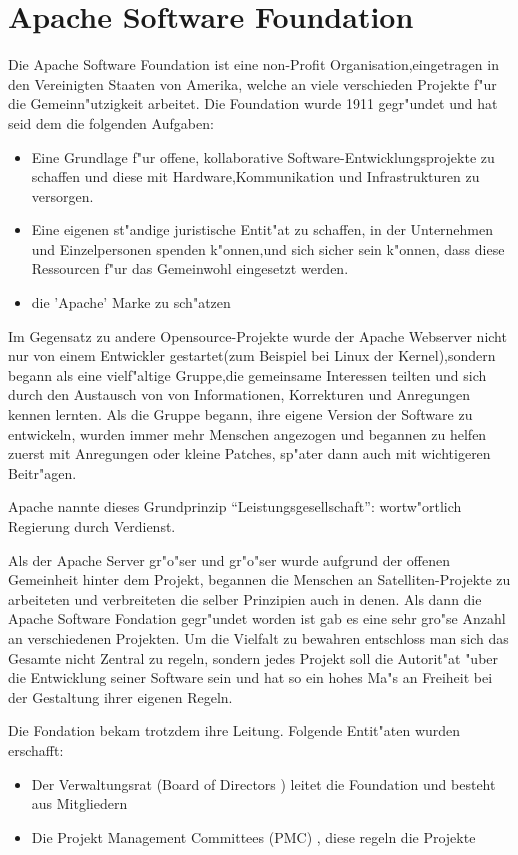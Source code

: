 \section{Apache Software Foundation}
Die Apache Software Foundation ist eine non-Profit Organisation,eingetragen in den Vereinigten Staaten von Amerika, welche an viele verschieden Projekte f"ur die Gemeinn"utzigkeit arbeitet. Die Foundation wurde 1911 gegr"undet und hat seid dem die folgenden Aufgaben:
\begin{itemize}
\item{Eine Grundlage f"ur offene, kollaborative Software-Entwicklungsprojekte zu schaffen und diese mit Hardware,Kommunikation und Infrastrukturen zu versorgen. }
\item{Eine eigenen st"andige juristische Entit"at zu schaffen, in der Unternehmen und Einzelpersonen spenden k"onnen,und sich sicher sein k"onnen, dass diese Ressourcen f"ur das Gemeinwohl eingesetzt werden.}
\item{die 'Apache' Marke zu sch"atzen}
\end{itemize}
Im Gegensatz zu andere Opensource-Projekte wurde der Apache Webserver nicht nur von einem Entwickler gestartet(zum Beispiel bei Linux der Kernel),sondern begann als eine vielf"altige Gruppe,die gemeinsame Interessen teilten und sich durch den Austausch von  von Informationen, Korrekturen und Anregungen kennen lernten.
Als die Gruppe begann, ihre eigene Version der Software zu entwickeln, wurden immer mehr Menschen angezogen und begannen zu helfen zuerst mit Anregungen oder kleine Patches, sp"ater dann auch mit wichtigeren Beitr"agen.

Apache nannte dieses Grundprinzip ``Leistungsgesellschaft'': wortw"ortlich Regierung durch Verdienst.

Als der Apache Server gr"o"ser und gr"o"ser  wurde aufgrund der offenen Gemeinheit hinter dem Projekt, begannen die Menschen an Satelliten-Projekte  zu arbeiteten  und verbreiteten die selber Prinzipien auch in denen.
Als dann die Apache Software Fondation gegr"undet worden ist gab es eine sehr gro"se Anzahl an verschiedenen Projekten. Um die Vielfalt zu bewahren entschloss man sich das Gesamte nicht Zentral zu regeln, sondern jedes Projekt soll die Autorit"at "uber die Entwicklung seiner Software sein und hat so ein hohes Ma"s an Freiheit bei der Gestaltung ihrer eigenen Regeln.

\newpage 
Die Fondation bekam trotzdem ihre Leitung. Folgende Entit"aten wurden erschafft:
\begin{itemize}
\item{Der Verwaltungsrat (Board of Directors ) leitet die Foundation und besteht aus Mitgliedern}
\item{Die Projekt Management Committees (PMC) , diese regeln die Projekte}
\end{itemize}

